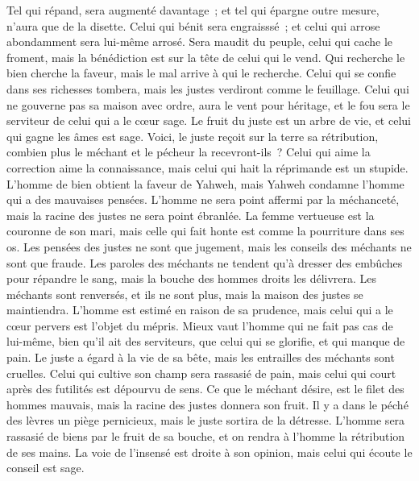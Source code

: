 \begin{multicols}{2}
Tel qui répand, sera augmenté davantage~; et tel qui épargne outre mesure, n'aura que de la disette.
Celui qui bénit sera engraisssé~; et celui qui arrose abondamment sera lui-même arrosé.
Sera maudit du peuple, celui qui cache le froment, mais la bénédiction est sur la tête de celui qui le vend.
Qui recherche le bien cherche la faveur, mais le mal arrive à qui le recherche.
Celui qui se confie dans ses richesses tombera, mais les justes verdiront comme le feuillage.
Celui qui ne gouverne pas sa maison avec ordre, aura le vent pour héritage, et le fou sera le serviteur de celui qui a le cœur sage.
Le fruit du juste est un arbre de vie, et celui qui gagne les âmes est sage.
Voici, le juste reçoit sur la terre sa rétribution, combien plus le méchant et le pécheur la recevront-ils~?
\VerseOne{}Celui qui aime la correction aime la connaissance, mais celui qui hait la réprimande est un stupide.
L'homme de bien obtient la faveur de Yahweh, mais Yahweh condamne l'homme qui a des mauvaises pensées.
L'homme ne sera point affermi par la méchanceté, mais la racine des justes ne sera point ébranlée.
La femme vertueuse est la couronne de son mari, mais celle qui fait honte est comme la pourriture dans ses os.
Les pensées des justes ne sont que jugement, mais les conseils des méchants ne sont que fraude.
Les paroles des méchants ne tendent qu'à dresser des embûches pour répandre le sang, mais la bouche des hommes droits les délivrera.
Les méchants sont renversés, et ils ne sont plus, mais la maison des justes se maintiendra.
L'homme est estimé en raison de sa prudence, mais celui qui a le cœur pervers est l'objet du mépris.
Mieux vaut l'homme qui ne fait pas cas de lui-même, bien qu'il ait des serviteurs, que celui qui se glorifie, et qui manque de pain.
Le juste a égard à la vie de sa bête, mais les entrailles des méchants sont cruelles.
Celui qui cultive son champ sera rassasié de pain, mais celui qui court après des futilités est dépourvu de sens.
Ce que le méchant désire, est le filet des hommes mauvais, mais la racine des justes donnera son fruit.
Il y a dans le péché des lèvres un piège pernicieux, mais le juste sortira de la détresse.
L'homme sera rassasié de biens par le fruit de sa bouche, et on rendra à l'homme la rétribution de ses mains.
La voie de l'insensé est droite à son opinion, mais celui qui écoute le conseil est sage.

\end{multicols}
